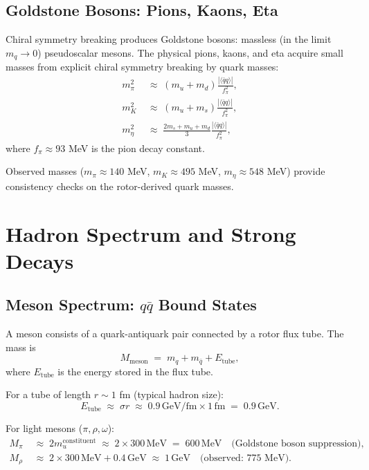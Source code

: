 \documentclass[11pt,a4paper]{article}
\theoremstyle{definition}
\theoremstyle{plain}
\theoremstyle{remark}
\begin{document}
\subsection{Goldstone Bosons: Pions, Kaons, Eta}

Chiral symmetry breaking produces Goldstone bosons: massless (in the limit $m_q \to 0$) pseudoscalar mesons. The physical pions, kaons, and eta acquire small masses from explicit chiral symmetry breaking by quark masses:
\begin{align}
m_\pi^2 &\;\approx\; (m_u + m_d)\frac{|\langle\bar{q}q\rangle|}{f_\pi^2}, \\
m_K^2 &\;\approx\; (m_u + m_s)\frac{|\langle\bar{q}q\rangle|}{f_\pi^2}, \\
m_\eta^2 &\;\approx\; \frac{2m_s + m_u + m_d}{3}\frac{|\langle\bar{q}q\rangle|}{f_\pi^2},
\end{align}
where $f_\pi \approx 93$ MeV is the pion decay constant.

Observed masses ($m_\pi \approx 140$ MeV, $m_K \approx 495$ MeV, $m_\eta \approx 548$ MeV) provide consistency checks on the rotor-derived quark masses.

\vspace{1em}

\section{Hadron Spectrum and Strong Decays}
\label{sec:hadron-spectrum}

\subsection{Meson Spectrum: $q\bar{q}$ Bound States}

A meson consists of a quark-antiquark pair connected by a rotor flux tube. The mass is
\begin{equation}
M_{\mathrm{meson}} \;=\; m_q + m_{\bar{q}} + E_{\mathrm{tube}},
\end{equation}
where $E_{\mathrm{tube}}$ is the energy stored in the flux tube.

For a tube of length $r \sim 1$ fm (typical hadron size):
\begin{equation}
E_{\mathrm{tube}} \;\approx\; \sigma r \;\approx\; 0.9\,\text{GeV/fm} \times 1\,\text{fm} \;=\; 0.9\,\text{GeV}.
\end{equation}

For light mesons ($\pi, \rho, \omega$):
\begin{align}
M_\pi &\;\approx\; 2m_u^{\mathrm{constituent}} \;\approx\; 2 \times 300\,\text{MeV} \;=\; 600\,\text{MeV} \quad\text{(Goldstone boson suppression)}, \\
M_\rho &\;\approx\; 2 \times 300\,\text{MeV} + 0.4\,\text{GeV} \;\approx\; 1\,\text{GeV} \quad\text{(observed: 775 MeV)}.
\end{align}
\end{document}
